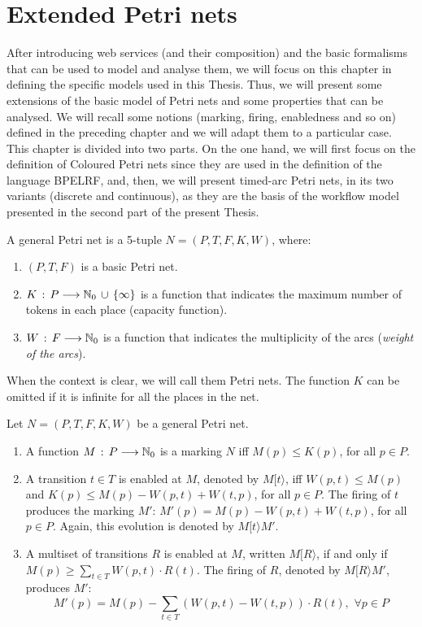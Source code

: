 \chapter{Extended Petri nets}\label{chapter:c3}
After introducing web services (and their composition) and the basic formalisms
that can be used to model and analyse them, we will focus on this chapter in defining the specific models used in this Thesis. Thus, we
will present some extensions of the basic model of Petri nets and some properties
that can be analysed. We will recall some notions (marking, firing, enabledness and so on) defined in the preceding chapter
and we will adapt them to a particular case. This chapter is divided into two parts. On the one hand,
we will first focus on the definition of Coloured Petri nets since they are used in the definition of the language BPELRF, and, then,
we will present timed-arc Petri nets, in its two variants (discrete and continuous), as they are the basis of the workflow model presented in the
second part of the present Thesis.

\begin{definition} 
A general Petri net is a 5-tuple $N=(P,T,F,K,W)$, where:
\begin{enumerate}
\item $(P,T,F)$ is a basic Petri net.
\item $K\,:\,P \longrightarrow \mathbb{N}_{0} \,\cup\, \{\infty\}$ is a function that
indicates the maximum number of tokens in each place (capacity function).
\item $W\,:\,F \longrightarrow \mathbb{N}_{0}$ is a function that indicates
the multiplicity of the arcs ({\it weight of the arcs}).
\end{enumerate}
When the context is clear, we will call them Petri nets. The function $K$
can be omitted if it is infinite for all the places in the net.
\end{definition}

\begin{definition} 
Let $N=(P,T,F,K,W)$ be a general Petri net.
\begin{enumerate}
\item A function $M\,:\, P \longrightarrow \mathbb{N}_{0}$ is a marking
$N$ iff $M(p) \leq K(p)$, for all
$p \in P$.
\item A transition $t \in T$ is enabled at $M$, denoted by $M[ t \rangle$,
iff $W(p,t) \leq M(p)$ and  $K(p) \leq M(p)-W(p,t)+W(t,p)$, for all $p \in P$.
The firing of $t$ produces the marking $M'$:
$M'(p) = M(p) - W(p,t) + W(t,p)$, for all $p \in P$.
Again, this evolution is denoted by $M[ t \rangle M'$.
\item A multiset of transitions $R$ is enabled at $M$, written $M [ R \rangle$, if and only if
$M(p) \geq \sum_{t \in T} W(p,t) \cdot R(t)$. The firing of $R$,  denoted by $M [ R \rangle M'$,
produces $M'$:
\[ M'(p) = M(p) - \sum_{t \in T} (W(p,t) - W(t,p)) \cdot R(t), \,\,
\forall p \in P\]
\end{enumerate}
\end{definition}

